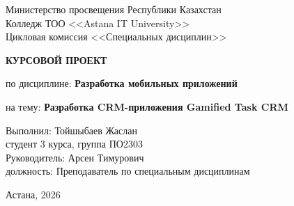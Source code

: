 \documentclass[a4paper,14pt]{extarticle}
\numberwithin{equation}{section}
\begin{document}
\begin{titlepage}
\thispagestyle{empty}
\begin{center}
Министерство просвещения Республики Казахстан \\
Колледж ТОО <<Astana IT University>> \\
Цикловая комиссия <<Специальных дисциплин>>

\vspace{4\baselineskip}
\textbf{КУРСОВОЙ ПРОЕКТ}

\vspace{2\baselineskip}
по дисциплине: \textbf{Разработка мобильных приложений}

\vspace{1.2\baselineskip}
на тему: \textbf{Разработка CRM-приложения Gamified Task CRM}

\vfill
\begin{flushright}
\begin{minipage}{0.46\textwidth}
\raggedright
Выполнил: Тойшыбаев Жаслан\\[0.6\baselineskip]
студент 3 курса, группа ПО2303\\[0.6\baselineskip]
Руководитель: Арсен Тимурович\\[0.6\baselineskip]
должность: Преподаватель по специальным дисциплинам
\end{minipage}
\end{flushright}

\vfill
Астана, 2026
\end{center}
\end{titlepage}

\clearpage
\thispagestyle{empty}
\tableofcontents

\clearpage
\setcounter{page}{3}
\pagestyle{main}






\clearpage


\clearpage
\pagestyle{empty}

\end{document}
